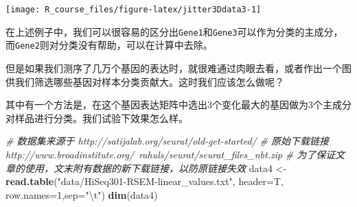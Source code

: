\documentclass[]{article}
\newenvironment{Shaded}{\begin{snugshade}}{\end{snugshade}}
\newcommand{\KeywordTok}[1]{\textcolor[rgb]{0.13,0.29,0.53}{\textbf{{#1}}}}
\newcommand{\DataTypeTok}[1]{\textcolor[rgb]{0.13,0.29,0.53}{{#1}}}
\newcommand{\DecValTok}[1]{\textcolor[rgb]{0.00,0.00,0.81}{{#1}}}
\newcommand{\CharTok}[1]{\textcolor[rgb]{0.31,0.60,0.02}{{#1}}}
\newcommand{\StringTok}[1]{\textcolor[rgb]{0.31,0.60,0.02}{{#1}}}
\newcommand{\CommentTok}[1]{\textcolor[rgb]{0.56,0.35,0.01}{\textit{{#1}}}}
\newcommand{\NormalTok}[1]{{#1}}
\numberwithin{figure}{section}
\numberwithin{table}{section}
\theoremstyle{definition}
\theoremstyle{definition}
\theoremstyle{definition}
\theoremstyle{remark}
\begin{document}
\begin{Shaded}
\end{Shaded}

\begin{center}\texttt{[image: R\_course\_files/figure-latex/jitter3Ddata3-1]} \end{center}

在上述例子中，我们可以很容易的区分出\texttt{Gene1}和\texttt{Gene3}可以作为分类的主成分，而\texttt{Gene2}则对分类没有帮助，可以在计算中去除。

但是如果我们测序了几万个基因的表达时，就很难通过肉眼去看，或者作出一个图供我们筛选哪些基因对样本分类贡献大。这时我们应该怎么做呢？

其中有一个方法是，在这个基因表达矩阵中选出3个变化最大的基因做为3个主成分对样品进行分类。我们试验下效果怎么样。

\begin{Shaded}
\begin{Highlighting}[]
\CommentTok{# 数据集来源于 http://satijalab.org/seurat/old-get-started/}
\CommentTok{# 原始下载链接 http://www.broadinstitute.org/~rahuls/seurat/seurat_files_nbt.zip}
\CommentTok{# 为了保证文章的使用，文末附有数据的新下载链接，以防原链接失效}
\NormalTok{data4 <-}\StringTok{ }\KeywordTok{read.table}\NormalTok{(}\StringTok{"data/HiSeq301-RSEM-linear_values.txt"}\NormalTok{, }\DataTypeTok{header=}\NormalTok{T, }\DataTypeTok{row.names=}\DecValTok{1}\NormalTok{,}\DataTypeTok{sep=}\StringTok{"}\CharTok{\textbackslash{}t}\StringTok{"}\NormalTok{)}
\KeywordTok{dim}\NormalTok{(data4)}
\end{Highlighting}
\end{Shaded}
\end{document}
